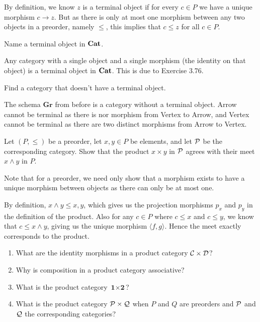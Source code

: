 \solution
By definition, we know $z$ is a terminal object if for every $c\in P$ we have a unique morphism $c\to z$.  But as there is only at most one morphism between any two objects in a preorder, namely $\leq$, this implies that $c\leq z$ for all $c\in P$.

Name a terminal object in $\textbf{Cat}$.

\solution
Any category with a single object and a single morphism (the identity on that object) is a terminal object in $\textbf{Cat}$.  This is due to Exercise 3.76.

Find a category that doesn't have a terminal object.

\solution
The schema $\textbf{Gr}$ from before is a category without a terminal object.  Arrow cannot be terminal as there is nor morphism from Vertex to Arrow, and Vertex cannot be terminal as there are two distinct morphisms from Arrow to Vertex.

Let $(P,\leq)$ be a preorder, let $x,y\in P$ be elements, and let $\mathcal{P}$ be the corresponding category.  Show that the product $x\times y$ in $\mathcal{P}$ agrees with their meet $x\land y$ in $P$.

\solution
Note that for a preorder, we need only show that a morphism exists to have a unique morphism between objects as there can only be at most one.

By definition, $x\land y \leq x,y$, which gives us the projection morphisms $p_x$ and $p_y$ in the definition of the product.  Also for any $c\in P$ where $c\leq x$ and $c\leq y$, we know that $c\leq x\land y$, giving us the unique morphism $\langle f,g\rangle$.  Hence the meet exactly corresponds to the product.

\begin{enumerate}
	\item What are the identity morphisms in a product category $\mathcal{C}\times\mathcal{D}$?
	\item Why is composition in a product category associative?
	\item What is the product category $\textbf{1}\times\textbf{2}$?
	\item What is the product category $\mathcal{P}\times\mathcal{Q}$ when $P$ and $Q$ are preorders and $\mathcal{P}$ and $\mathcal{Q}$ the corresponding categories?
\end{enumerate}

